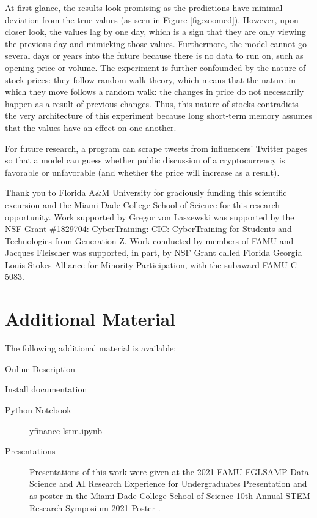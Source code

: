 At first glance, the results look promising as the predictions have minimal deviation from the true values (as seen in Figure \ref{fig:zoomed}). However, upon closer look, the values lag by one day, which is a sign that they are only viewing the previous day and mimicking those values. Furthermore, the model cannot go several days or years into the future because there is no data to run on, such as opening price or volume. The experiment is further confounded by the nature of stock prices: they follow random walk theory, which means that the nature in which they move follows a random walk: the changes in price do not necessarily happen as a result of previous changes. Thus, this nature of stocks contradicts the very architecture of this experiment because long short-term memory assumes that the values have an effect on one another.

For future research, a program can scrape tweets from influencers' Twitter pages so that a model can guess whether public discussion of a cryptocurrency is favorable or unfavorable (and whether the price will increase as a result).


\begin{acks}
Thank you to Florida A\&M University for graciously funding this scientific excursion and the Miami Dade College School of Science for this research opportunity. Work supported by Gregor von Laszewski was supported by the NSF Grant \#1829704: CyberTraining: CIC: CyberTraining for Students and Technologies from Generation Z.
Work conducted by members of FAMU and Jacques Fleischer was supported, in part, by NSF Grant called Florida Georgia Louis Stokes Alliance for Minority Participation, with the subaward FAMU C-5083.
\end{acks}






\appendix

\section{Additional Material}

The following additional material is available:

\begin{description}

\item[Online Description] \cite{c14}

\item[Install documentation] \cite{c12}

\item[Python Notebook] yfinance-lstm.ipynb \cite{c13}

\item[Presentations] 
Presentations of this work were given at the
2021 FAMU-FGLSAMP Data Science and AI Research Experience for Undergraduates Presentation \cite{c15}
and as poster in the Miami Dade College School of Science 10th Annual STEM Research Symposium 2021 Poster \cite{c16}.

\end{description}
